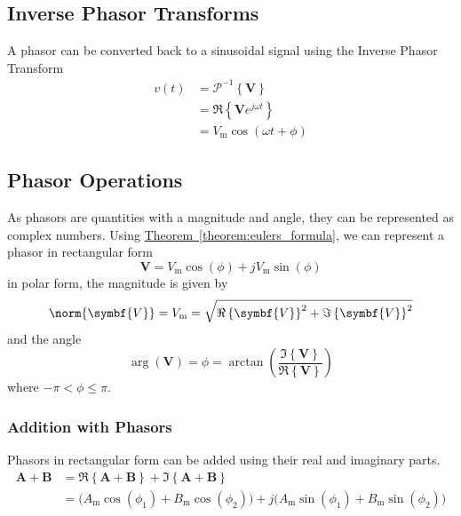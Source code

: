 \documentclass{article}
\begin{document}
\subsection{Inverse Phasor Transforms}
\begin{definition}
    A phasor can be converted back to a sinusoidal signal using the Inverse Phasor Transform
    \begin{align*}
        v(t) & = \mathscr{P}^{-1}\left\{ \symbf{V} \right\}         \\
             & = \Re\left\{ \symbf{V} e^{j\omega t} \right\}        \\
             & = V_{\mathrm{m}}\cos{\left( \omega t + \phi \right)}
    \end{align*}
\end{definition}
\subsection{Phasor Operations}
As phasors are quantities with a magnitude and angle, they can be represented as complex numbers.
Using \hyperref[theorem:eulers_formula]{Theorem~\ref{theorem:eulers_formula}}, we can represent a phasor in rectangular form
\begin{equation*}
    \symbf{V} = V_{\mathrm{m}} \cos{\left( \phi \right)} + j V_{\mathrm{m}} \sin{\left( \phi \right)}
\end{equation*}
in polar form, the magnitude is given by
\begin{equation*}
    \norm{\symbf{V}} = V_{\mathrm{m}} = \sqrt{\Re\left\{ \symbf{V} \right\}^2 + \Im\left\{ \symbf{V} \right\}^2}
\end{equation*}
and the angle
\begin{equation*}
    \arg{\left( \symbf{V} \right)} = \phi = \arctan{\left( \frac{\Im\left\{ \symbf{V} \right\}}{\Re\left\{ \symbf{V} \right\}} \right)}
\end{equation*}
where \(-\pi < \phi \leq \pi\).
\subsubsection{Addition with Phasors}
Phasors in rectangular form can be added using their real and imaginary parts.
\begin{align*}
    \symbf{A} + \symbf{B} & = \Re\left\{ \symbf{A} + \symbf{B} \right\} + \Im\left\{ \symbf{A} + \symbf{B} \right\}                                                                                                                      \\
                          & = \bigl( A_{\mathrm{m}}\cos{\left( \phi_1 \right)} + B_{\mathrm{m}}\cos{\left( \phi_2 \right)} \bigr) + j\bigl( A_{\mathrm{m}}\sin{\left( \phi_1 \right)} + B_{\mathrm{m}}\sin{\left( \phi_2 \right)} \bigr)
\end{align*}
\end{document}
